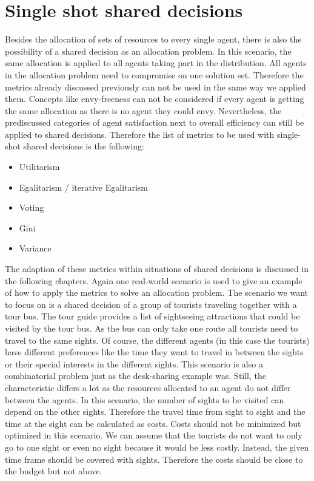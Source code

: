 \documentclass[german, a4paper, 11pt, oneside]{scrbook}
\begin{document}
\section{Single shot shared decisions}
Besides the allocation of sets of resources to every single agent, there is also the possibility of a shared decision as an allocation problem. In this scenario, the same allocation is applied to all agents taking part in the distribution. All agents in the allocation problem need to compromise on one solution set. Therefore the metrics already discussed previously can not be used in the same way we applied them. Concepts like envy-freeness can not be considered if every agent is getting the same allocation as there is no agent they could envy. Nevertheless, the prediscussed categories of agent satisfaction next to overall efficiency can still be applied to shared decisions. Therefore the list of metrics to be used with single-shot shared decisions is the following:
\begin{itemize}
  \item Utilitarism
  \item Egalitarism / iterative Egalitarism
  \item Voting
\item Gini
\item Variance
\end{itemize}
The adaption of these metrics within situations of shared decisions is discussed in the following chapters. Again one real-world scenario is used to give an example of how to apply the metrics to solve an allocation problem. The scenario we want to focus on is a shared decision of a group of tourists traveling together with a tour bus. The tour guide provides a list of sightseeing attractions that could be visited by the tour bus. As the bus can only take one route all tourists need to travel to the same sights. Of course, the different agents (in this case the tourists) have different preferences like the time they want to travel in between the sights or their special interests in the different sights. This scenario is also a combinatorial problem just as the desk-sharing example was. Still, the characteristic differs a lot as the resources allocated to an agent do not differ between the agents. In this scenario, the number of sights to be visited can depend on the other sights. Therefore the travel time from sight to sight and the time at the sight can be calculated as costs. Costs should not be minimized but optimized in this scenario. We can assume that the tourists do not want to only go to one sight or even no sight because it would be less costly. Instead, the given time frame should be covered with sights. Therefore the costs should be close to the budget but not above.
\end{document}
